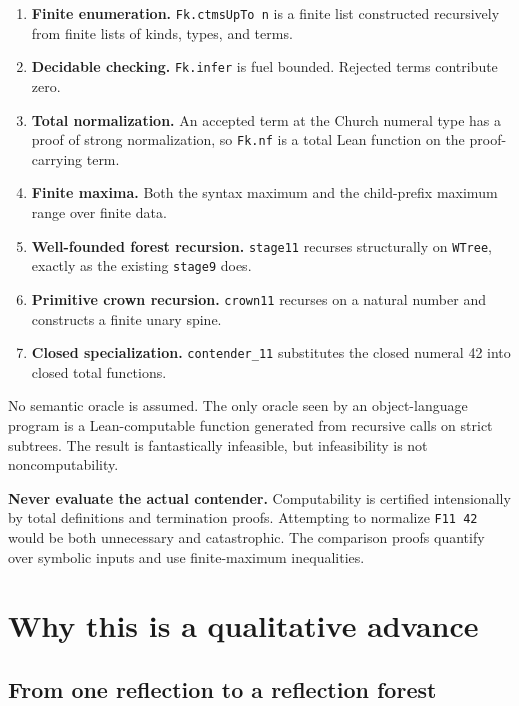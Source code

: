\documentclass[11pt]{article}
\theoremstyle{definition}
\theoremstyle{remark}
\newcommand{\code}[1]{\texttt{#1}}
\begin{document}
\begin{enumerate}
\item \textbf{Finite enumeration.}  \code{Fk.ctmsUpTo n} is a finite list
constructed recursively from finite lists of kinds, types, and terms.
\item \textbf{Decidable checking.}  \code{Fk.infer} is fuel bounded.  Rejected
terms contribute zero.
\item \textbf{Total normalization.}  An accepted term at the Church numeral
type has a proof of strong normalization, so \code{Fk.nf} is a total Lean
function on the proof-carrying term.
\item \textbf{Finite maxima.}  Both the syntax maximum and the child-prefix
maximum range over finite data.
\item \textbf{Well-founded forest recursion.}  \code{stage11} recurses
structurally on \code{WTree}, exactly as the existing \code{stage9} does.
\item \textbf{Primitive crown recursion.}  \code{crown11} recurses on a natural
number and constructs a finite unary spine.
\item \textbf{Closed specialization.}  \code{contender\_11} substitutes the
closed numeral 42 into closed total functions.
\end{enumerate}

No semantic oracle is assumed.  The only oracle seen by an object-language
program is a Lean-computable function generated from recursive calls on
strict subtrees.  The result is fantastically infeasible, but infeasibility is
not noncomputability.

\begin{warningbox}
\textbf{Never evaluate the actual contender.}
Computability is certified intensionally by total definitions and termination
proofs.  Attempting to normalize \code{F11 42} would be both unnecessary and
catastrophic.  The comparison proofs quantify over symbolic inputs and use
finite-maximum inequalities.
\end{warningbox}

\section{Why this is a qualitative advance}

\subsection{From one reflection to a reflection forest}
\end{document}
